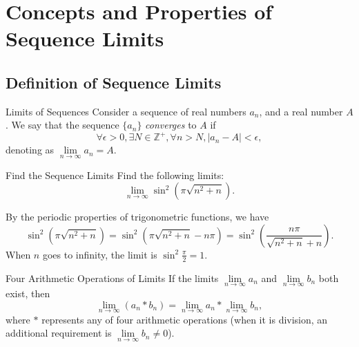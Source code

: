 
\section{Concepts and Properties of Sequence Limits}

\subsection{Definition of Sequence Limits}

\begin{definition}{Limits of Sequences}{}
  Consider a sequence of real numbers $a_n$, and a real number $A$.
  We say that the sequence $\{a_n\}$ \emph{converges} to $A$ if
  \begin{equation}
    \forall \epsilon > 0, \exists N \in \mathbb{Z}^+, \forall n > N, |a_n - A| < \epsilon,
  \end{equation}
  denoting as $\lim \limits _{n \rightarrow \infty}a_n = A$.
\end{definition}

\begin{example}{Find the Sequence Limits}{}
  Find the following limits:
  \begin{equation}
    \lim \limits _{n \rightarrow \infty} \sin^2(\pi \sqrt{n^2 + n}).
  \end{equation}
\end{example}

\begin{solution}
  By the periodic properties of trigonometric functions, we have
  \begin{equation}
    \sin^2 (\pi \sqrt{n^2 + n})
    = \sin^2 (\pi \sqrt{n^2 + n} - n \pi)
    = \sin^2 \left(\frac{n\pi}{\sqrt{n^2 + n} + n}\right).
  \end{equation}
  When $n$ goes to infinity, the limit is $\sin^2 \frac{\pi}{2} = 1$.
\end{solution}

\begin{proposition}{Four Arithmetic Operations of Limits}{}
  If the limits $\lim \limits _{n \rightarrow \infty} a_n$ and $\lim \limits _{n \rightarrow \infty} b_n$
  both exist, then
  \begin{equation}
    \lim \limits _{n \rightarrow \infty} (a_n \ast b_n) = \lim \limits _{n \rightarrow \infty} a_n \ast \lim \limits _{n \rightarrow \infty} b_n,
  \end{equation}
  where $\ast$ represents any of four arithmetic operations
  (when it is division, an additional requirement is $\lim \limits _{n
    \rightarrow \infty} b_n \neq 0$).
\end{proposition}

